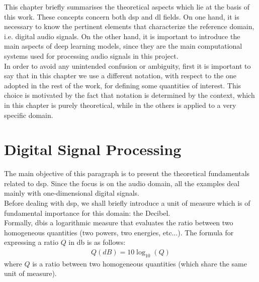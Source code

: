 This chapter briefly summarises the theoretical aspects which lie at the basis of this work. These concepts concern both \gls{dsp} and \gls{dl} fields. On one hand, it is necessary to know the pertinent elements that characterize the reference domain, i.e. digital audio signals. On the other hand, it is important to introduce the main aspects of deep learning models, since they are the main computational systems used for processing audio signals in this project. \\
In order to avoid any unintended confusion or ambiguity, first it is important to say that in this chapter we use a different notation, with respect to the one adopted in the rest of the work, for defining some quantities of interest. This choice is motivated by the fact that notation is determined by the context, which in this chapter is purely theoretical, while in the others is applied to a very specific domain. 

\section{Digital Signal Processing}
The main objective of this paragraph is to present the theoretical fundamentals related to \gls{dsp}. Since the focus is on the audio domain, all the examples deal  mainly with one-dimensional digital signals. \\
Before dealing with \gls{dsp}, we shall briefly introduce a unit of measure which is of fundamental importance for this domain: the Decibel. \\
Formally, \gls{db}is a logarithmic measure that evaluates the ratio between two homogeneous quantities (two powers, two energies, etc$\dots$). The formula for expressing a ratio $Q$ in \gls{db} is as follows:
\begin{align}
	Q (dB) = 10 \log_{10}(Q)
\end{align}
where $Q$ is a ratio between two homogeneous quantities (which share the same unit of measure). \\
